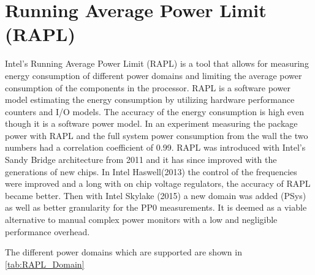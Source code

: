 \section{Running Average Power Limit (RAPL)}
Intel's Running Average Power Limit (RAPL) is a tool that allows for measuring energy consumption of different power domains and  limiting the average power consumption of the components in the processor. RAPL is a software power model estimating the energy consumption by utilizing hardware performance counters and I/O models.\cite{Power-Management_Sandy_Bridge} The accuracy of the energy consumption is  high even though it is a software power model\cite{RAPL_ACU1,RAPL_ACU2}. In an experiment measuring the package power with RAPL and the full system power consumption from the wall the two numbers had a correlation coefficient of 0.99.\cite{RAPL_in_action} RAPL was introduced with Intel's Sandy Bridge architecture from 2011 and it has since improved with the generations of new chips. In Intel Haswell(2013) the control of the frequencies were improved and a long with on chip voltage regulators, the accuracy of RAPL became better. Then with Intel Skylake (2015) a new domain was added (PSys) as well as better granularity for the PP0 measurements. It is deemed as   a viable alternative to manual complex power monitors with a low and negligible performance overhead. \cite{RAPL_in_action}

The different power domains which are supported are shown in \cref*{tab:RAPL_Domain}\nytafsnit

